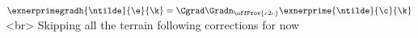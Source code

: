 $\exnerprimegradh{\ntilde}{\e}{\k} = \Cgrad \Gradn_{\offProv{e2c}} \exnerprime{\ntilde}{\c}{\k}$
<br>
Skipping all the terrain following corrections for now
